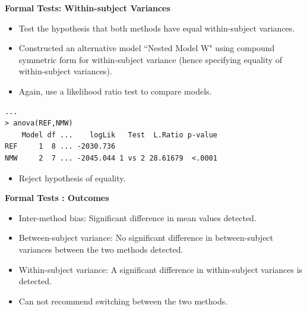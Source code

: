 \documentclass[compress]{beamer}        %
\makeatletter
\newcommand{\tcb}{\textcolor{beamer@blendedblue}}
\makeatother
\begin{document}
\begin{frame}[fragile]{\bf \tcb{Formal Tests: Within-subject Variances}}
\begin{itemize}
\item Test the hypothesis that both methods have equal within-subject variances.
\item Constructed an alternative model ``Nested Model W" using compound symmetric form for within-subject variance (hence specifying equality of within-subject variances).
\item Again, use a likelihood ratio test to compare models.
\end{itemize}
\begin{verbatim}
...
> anova(REF,NMW)
    Model df ...    logLik   Test  L.Ratio p-value
REF     1  8 ... -2030.736
NMW     2  7 ... -2045.044 1 vs 2 28.61679  <.0001
\end{verbatim}
\begin{itemize}
\item Reject hypothesis of equality.
\end{itemize}
\end{frame}
\begin{frame}[fragile]{\bf \tcb{Formal Tests : Outcomes}}
\large
\vspace{-1cm}
\begin{itemize}
\item Inter-method bias: Significant difference in mean values detected.\\
\vspace{0.25cm}\item Between-subject variance: No significant difference in between-subject variances between the two methods detected.\\
\vspace{0.25cm}\item Within-subject variance: A significant difference in within-subject variances is detected.\\
\vspace{0.25cm}\item Can not recommend switching between the two methods.
\end{itemize}
\end{frame}
\end{document}
